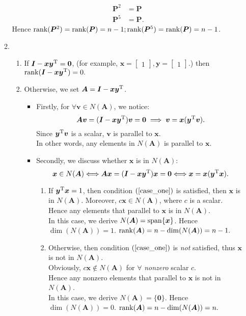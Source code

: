 \begin{enumerate}
\begin{enumerate}
\begin{align*}
\bm P^2&=\bm P\\
\bm P^5&=\bm P.
\end{align*}
Hence $\operatorname{rank}(\bm P^2)=\operatorname{rank}(\bm P)=n-1;\operatorname{rank}(\bm P^5)=\operatorname{rank}(\bm P)=n-1$.
\item
\begin{enumerate}
\item
If $\bm I-\bm x\bm y^{\mathrm T}=\bm 0$, (for example, $\bm x=\begin{bmatrix}
1
\end{bmatrix},\bm y=\begin{bmatrix}
1
\end{bmatrix}.$) then $\operatorname{rank}(\bm I-\bm x\bm y^{\mathrm T})=0.$
\item
Otherwise, we set $\bm A=\bm I-\bm x\bm y^{\mathrm T}$.
\begin{itemize}
\item
Firstly, for $\forall\bm v\in N(\bm A)$, we notice:
\[
\bm A\bm v=(\bm I-\bm x\bm y^{\mathrm T})\bm v=\bm0
\implies
\bm v=\bm x(\bm y^{\mathrm T}\bm v).
\]
Since $\bm y^{\mathrm T}\bm v$ is a scalar, $\bm v$ is parallel to $\bm x$.\\
In other words, any elements in $N(\bm A)$ is parallel to $\bm x.$
\item
Secondly, we discuss whether $\bm x$ is in $N(\bm A):$
\begin{equation}
\bm x\in N(\bm A)\Longleftrightarrow
\bm{Ax}=(\bm I-\bm x\bm y\trans)\bm x=\bm0
\Longleftrightarrow
\bm x=\bm x(\bm y\trans\bm x).\label{case_one}
\end{equation}
\begin{enumerate}
\item
If $\bm y^{\mathrm T}\bm x=1$, then condition $(\ref{case_one})$ is satisfied, then $\bm x$ is in $N(\bm A)$. Moreover, $c\bm x\in N(\bm A)$, where $c$ is a scalar.\\
Hence any elements that parallel to $\bm x$ is in $N(\bm A)$.\\
In this case, we derive $N(\bm A)=\operatorname{span}\{\bm x\}$. Hence $\dim(N(\bm A))=1.$ $\operatorname{rank}(\bm A)=n-\dim(N(\bm A))=n-1.$
\item
Otherwise, then condition $(\ref{case_one})$ is  \emph{not} satisfied, thus $\bm x$ is not in $N(\bm A)$.\\
Obviously, $c\bm x\notin N(\bm A)$ for $\forall$ \emph{nonzero} scalar $c$.\\
Hence any nonzero elements that parallel to $\bm x$ is not in $N(\bm A)$.\\
In this case, we derive $N(\bm A)=\{\bm0\}.$ Hence $\dim(N(\bm A))=0.$ $\operatorname{rank}(\bm A)=n-\dim(N(\bm A))=n.$

\end{enumerate}
\end{itemize}
\end{enumerate}
\end{enumerate}
\end{enumerate}
